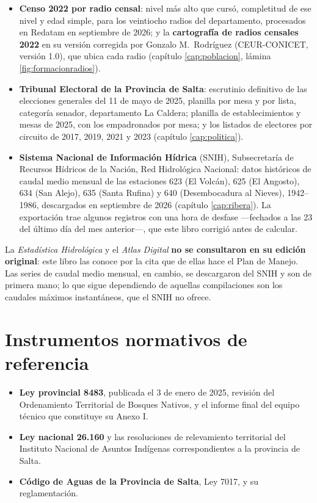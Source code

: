 \begin{itemize}[leftmargin=*]
\item \textbf{Censo 2022 por radio censal}: nivel más alto que cursó, completitud de ese nivel y edad simple, para los veintiocho radios del departamento, procesados en Redatam en septiembre de 2026; y la \textbf{cartografía de radios censales 2022} en su versión corregida por Gonzalo M.\ Rodríguez (CEUR-CONICET, versión 1.0), que ubica cada radio (capítulo \ref{cap:poblacion}, lámina \ref{fig:formacionradios}).
\item \textbf{Tribunal Electoral de la Provincia de Salta}: escrutinio definitivo de las elecciones generales del 11 de mayo de 2025, planilla por mesa y por lista, categoría senador, departamento La Caldera; planilla de establecimientos y mesas de 2025, con los empadronados por mesa; y los listados de electores por circuito de 2017, 2019, 2021 y 2023 (capítulo \ref{cap:politica}).
\item \textbf{Sistema Nacional de Información Hídrica} (SNIH), Subsecretaría de Recursos Hídricos de la Nación, Red Hidrológica Nacional: datos históricos de caudal medio mensual de las estaciones 623 (El Volcán), 625 (El Angosto), 634 (San Alejo), 635 (Santa Rufina) y 640 (Desembocadura al Nieves), 1942--1986, descargados en septiembre de 2026 (capítulo \ref{cap:ribera}). La exportación trae algunos registros con una hora de desfase ---fechados a las 23 del último día del mes anterior---, que este libro corrigió antes de calcular.
\end{itemize}

\begin{cautela}
La \textit{Estadística Hidrológica} y el \textit{Atlas Digital} \textbf{no se consultaron en su edición original}: este libro las conoce por la cita que de ellas hace el Plan de Manejo. Las series de caudal medio mensual, en cambio, se descargaron del SNIH y son de primera mano; lo que sigue dependiendo de aquellas compilaciones son los caudales máximos instantáneos, que el SNIH no ofrece.
\end{cautela}

\section{Instrumentos normativos de referencia}

\begin{itemize}[leftmargin=*]
\item \textbf{Ley provincial 8483}, publicada el 3 de enero de 2025, revisión del
Ordenamiento Territorial de Bosques Nativos, y el informe final del equipo técnico que
constituye su Anexo I.
\item \textbf{Ley nacional 26.160} y las resoluciones de relevamiento territorial del
Instituto Nacional de Asuntos Indígenas correspondientes a la provincia de Salta.
\item \textbf{Código de Aguas de la Provincia de Salta}, Ley 7017, y su reglamentación.
\end{itemize}


